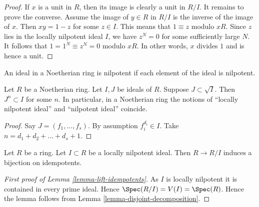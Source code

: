 \begin{proof}
If $x$ is a unit in $R$, then its image is clearly a unit in $R/I$.
It remains to prove the converse.
Assume the image of $y \in R$ in $R/I$ is the inverse of the image of $x$.
Then $xy = 1 - z$ for some $z \in I$.
This means that $1\equiv z$ modulo $xR$.
Since $z$ lies in the locally nilpotent ideal
$I$, we have $z^N = 0$ for some sufficiently large $N$.
It follows that $1 = 1^N \equiv z^N = 0$ modulo $xR$.
In other words, $x$ divides $1$ and is hence a unit.
\end{proof}

\begin{lemma}
\label{lemma-Noetherian-power}
\begin{slogan}
An ideal in a Noetherian ring is nilpotent if each element
of the ideal is nilpotent.
\end{slogan}
Let $R$ be a Noetherian ring. Let $I, J$ be ideals of $R$.
Suppose $J \subset \sqrt{I}$. Then $J^n \subset I$ for some $n$.
In particular, in a Noetherian ring the notions of
``locally nilpotent ideal''
and ``nilpotent ideal'' coincide.
\end{lemma}

\begin{proof}
Say $J = (f_1, \ldots, f_s)$.
By assumption $f_i^{d_i} \in I$.
Take $n = d_1 + d_2 + \ldots + d_s + 1$.
\end{proof}

\begin{lemma}
\label{lemma-lift-idempotents}
Let $R$ be a ring. Let $I \subset R$ be a locally nilpotent ideal.
Then $R \to R/I$ induces a bijection on idempotents.
\end{lemma}

\begin{proof}[First proof of Lemma \ref{lemma-lift-idempotents}]
As $I$ is locally nilpotent it is contained in every prime ideal.
Hence $\Spec(R/I) = V(I) = \Spec(R)$. Hence the
lemma follows from Lemma \ref{lemma-disjoint-decomposition}.
\end{proof}


